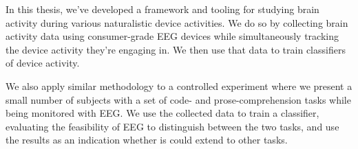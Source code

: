

In this thesis, we've developed a framework and tooling for studying brain activity during various naturalistic device activities. We do so by collecting brain activity data using consumer-grade EEG devices while simultaneously tracking the device activity they're engaging in. We then use that data to train classifiers of device activity.

We also apply similar methodology to a controlled experiment where we present a small number of subjects with a set of code- and prose-comprehension tasks while being monitored with EEG\@. We use the collected data to train a classifier, evaluating the feasibility of EEG to distinguish between the two tasks, and use the results as an indication whether is could extend to other tasks.
